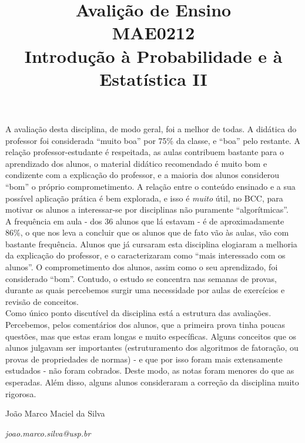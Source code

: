 \documentclass{article}
\date{%
	}
\title{Avalição de Ensino\\
       MAE0212\\
       Introdução à Probabilidade e à Estatística II}
\author{}
\begin{document}
\maketitle
\thispagestyle{empty}

A avaliação desta disciplina, de modo geral, foi a melhor de todas. A didática do professor foi considerada ``muito boa'' por 75\% da classe, e ``boa'' pelo restante. A relação professor-estudante é respeitada, as aulas contribuem bastante para o aprendizado dos alunos, o material didático recomendado \cite{FMC} \cite{FPA} é muito bom e condizente com a explicação do professor, e a maioria dos alunos considerou ``bom'' o próprio comprometimento. A relação entre o conteúdo ensinado e a sua possível aplicação prática é bem explorada, e isso é \emph{muito} útil, no BCC, para motivar os alunos a interessar-se por disciplinas não puramente ``algorítmicas''.\\
\indent A frequência em aula - dos 36 alunos que lá estavam - é de aproximadamente 86\%, o que nos leva a concluir que os alunos que de fato vão às aulas, vão com bastante frequência. Alunos que já cursaram esta disciplina elogiaram a melhoria da explicação do professor, e o caracterizaram como ``mais interessado com os alunos''. O comprometimento dos alunos, assim como o seu aprendizado, foi considerado ``bom''. Contudo, o estudo se concentra nas semanas de provas, durante as quais percebemos surgir uma necessidade por aulas de exercícios e revisão de conceitos.\\
\indent Como único ponto discutível da disciplina está a estrutura das avaliações. Percebemos, pelos comentários dos alunos, que a primeira prova tinha poucas questões, mas que estas eram longas e muito específicas. Alguns conceitos que os alunos julgavam ser importantes (estruturamento dos algoritmos de fatoração, ou provas de propriedades de normas) - e que por isso foram mais extensamente estudados - não foram cobrados. Deste modo, as notas foram menores do que as esperadas. Além disso, alguns alunos consideraram a correção da disciplina muito rigorosa. 

\vspace{6ex}

João Marco Maciel da Silva

\emph{joao.marco.silva@usp.br}





\end{document}
